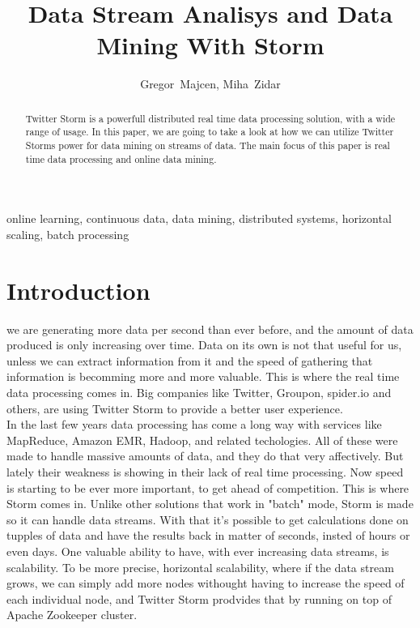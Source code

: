\documentclass[journal]{IEEEtran/IEEEtran}
\begin{document}
\title{Data Stream Analisys and Data Mining With Storm}

\author{Gregor~Majcen, Miha~Zidar}%
\maketitle
\begin{abstract}
    Twitter Storm is a powerfull distributed real time data processing solution, with a wide range of usage. In this paper, we are going to take a look at how we can utilize Twitter Storms power for data mining on streams of data. The main focus of this paper is real time data processing and online data mining.
\end{abstract}

\begin{IEEEkeywords}
    online learning, continuous data, data mining, distributed systems, horizontal scaling, batch processing
\end{IEEEkeywords}

\IEEEpeerreviewmaketitle


\section{Introduction}
 we are generating more data per second than ever before, and the amount of data produced is only increasing over time. Data on its own is not that useful for us, unless we can extract information from it and the speed of gathering that information is becomming more and more valuable. This is where the real time data processing comes in. Big companies like Twitter, Groupon, spider.io and others, are using Twitter Storm to provide a better user experience.\\

In the last few years data processing has come a long way with services like MapReduce, Amazon EMR, Hadoop, and related techologies. All of these were made to handle massive amounts of data, and they do that very affectively. But lately their weakness is showing in their lack of real time processing. Now speed is starting to be ever more important, to get ahead of competition. This is where Storm comes in. Unlike other solutions that work in "batch" mode, Storm is made so it can handle data streams. With that it's possible to get calculations done on tupples of data and have the results back in matter of seconds, insted of hours or even days. One valuable ability to have, with ever increasing data streams, is scalability. To be more precise, horizontal scalability, where if the data stream grows, we can simply add more nodes withought having to increase the speed of each individual node, and Twitter Storm prodvides that by running on top of Apache Zookeeper cluster.
\end{document}

